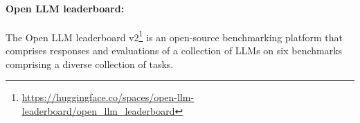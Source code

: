 \paragraph{Open LLM leaderboard:} The {Open LLM leaderboard v2}\footnote{\url{https://huggingface.co/spaces/open-llm-leaderboard/open\_llm\_leaderboard}} \citep{open-llm-leaderboard-v2} is an open-source benchmarking platform that comprises responses and evaluations of a collection of LLMs on six benchmarks comprising a diverse collection of tasks. %
